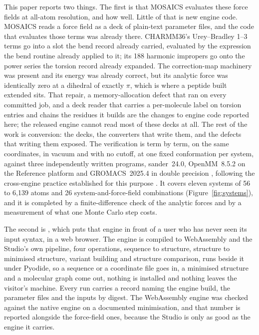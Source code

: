 This paper reports two things. The first is that MOSAICS evaluates these force
fields at all-atom resolution, and how well. Little of that is new engine code.
MOSAICS reads a force field as a deck of plain-text parameter files, and the
code that evaluates those terms was already there. CHARMM36's Urey--Bradley
1--3 terms go into a slot the bend record already carried, evaluated by the
expression the bend routine already applied to it; its 188 harmonic impropers
go onto the power series the torsion record already expanded. The
correction-map machinery was present and its energy was already correct, but
its analytic force was identically zero at a dihedral of exactly $\pi$, which is
where a peptide built extended sits. That repair, a memory-allocation defect
that ran on every committed job, and a deck reader that carries a per-molecule
label on torsion entries and chains the residues it builds are the changes to
engine code reported here; the released engine cannot read most of these decks
at all. The rest of the work is conversion:
the decks, the converters that write them, and the defects that writing them
exposed. The verification is term by term, on the same coordinates, in vacuum
and with no cutoff, at one fixed conformation per system, against three
independently written programs, sander~24.0, OpenMM~8.5.2 on the Reference
platform and GROMACS~2025.4 in double precision
\cite{case2023ambertools,eastman2017openmm7,eastman2024openmm8,abraham2015gromacs},
following the cross-engine practice established for this purpose
\cite{shirts2017engines,braun2018bestpractices}. It covers eleven systems of
56 to 6,139 atoms and 26 system-and-force-field combinations
(Figure~\ref{fig:systems}), and it is completed by a finite-difference check of
the analytic forces and by a measurement of what one Monte Carlo step costs.

The second is \studio{}, which puts that engine in front of a user who has
never seen its input syntax, in a web browser. The engine is compiled to
WebAssembly and the Studio's own pipeline, four operations, sequence to
structure, structure to minimised structure, variant building and structure
comparison, runs beside it under Pyodide, so a sequence or a coordinate file
goes in, a minimised structure and a molecular graph come out, nothing is
installed and nothing leaves the visitor's machine. Every run carries a record
naming the engine build, the parameter files and the inputs by digest. The
WebAssembly engine was checked against the native engine on a documented
minimisation, and that number is reported alongside the force-field ones,
because the Studio is only as good as the engine it carries.

